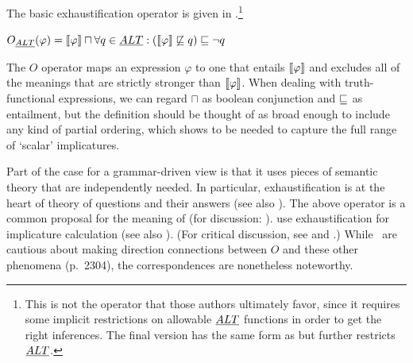 \documentclass[leqno]{article}
\begin{document}
The basic exhaustification operator is given in 
\citep{Spector:2007,Fox:2007,Fox:2009,Magri:2009,ChierchiaFoxSpector08}.\footnote{This
  is not the operator that those authors ultimately favor, since it
  requires some implicit restrictions on allowable $\emph{ALT}$ functions in
  order to get the right inferences.  The final version has the same
  form as  but further restricts $\emph{ALT}$.}
%
\begin{examples}
\item\label{def:O}
  $O_{\emph{ALT}}(\varphi) = 
  \llbracket\varphi\rrbracket \sqcap 
  \forall q \in \emph{ALT} : (\llbracket\varphi\rrbracket \not\sqsubseteq q) \sqsubseteq \neg q$
\end{examples}
%
The $O$ operator maps an expression $\varphi$ to one that entails
$\llbracket\varphi\rrbracket$ and excludes all of the meanings that are strictly
stronger than $\llbracket\varphi\rrbracket$. When dealing with truth-functional
expressions, we can regard $\sqcap$ as boolean conjunction and
$\sqsubseteq$ as entailment, but the definition should be thought of as
broad enough to include any kind of partial ordering, which
 shows to be needed to capture the full
range of `scalar' implicatures.

Part of the case for a grammar-driven view is that it uses pieces of
semantic theory that are independently needed. In particular,
exhaustification is at the heart of  theory
of questions and their answers (see also
\citealt{JohnMcCarthy80}). The above operator is a common proposal for
the meaning of  (for discussion:
\citealt{Rooth96,Buring01,BeaverClark08}).  \citet{SchulzVanRooij06}
use exhaustification for implicature calculation (see also
\citealt{deJagerVanRooij07}).  (For critical discussion, see
\citealt{Alonso-Ovalle:2008} and \citealt{Gajewski:2012}.) While \CFS\
are cautious about making direction connections between $O$ and these
other phenomena (p.~2304), the correspondences are nonetheless
noteworthy.
\end{document}
